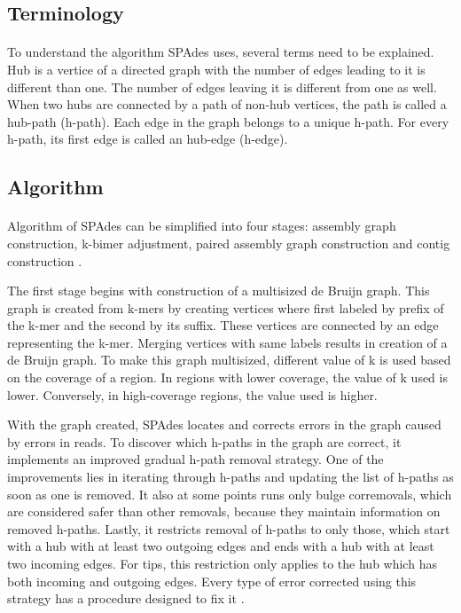 \subsection{Terminology}
\paragraph*{}
To understand the algorithm SPAdes uses, several terms need to be explained. Hub is a vertice of a directed graph with the number of edges leading to it is different than one. The number of edges leaving it is different from one as well. When two hubs are connected by a path of non-hub vertices, the path is called a hub-path (h-path). Each edge in the graph belongs to a unique h-path. For every h-path, its first edge is called an hub-edge (h-edge).

\subsection{Algorithm}
\paragraph*{}
Algorithm of SPAdes can be simplified into four stages: assembly graph construction, k-bimer adjustment, paired assembly graph construction and contig construction \cite{bankevich2012spades}. 

The first stage begins with construction of a multisized de Bruijn graph. This graph is created from k-mers by creating vertices where first labeled by prefix of the k-mer and the second by its suffix. These vertices are connected by an edge representing the k-mer. Merging vertices with same labels results in creation of a de Bruijn graph. To make this graph multisized, different value of k is used based on the coverage of a region. In regions with lower coverage, the value of k used is lower. Conversely, in high-coverage regions, the value used is higher. 

With the graph created, SPAdes locates and corrects errors in the graph caused by errors in reads. To discover which h-paths in the graph are correct, it implements an improved gradual h-path removal strategy. One of the improvements lies in iterating through h-paths and updating the list of h-paths as soon as one is removed. It also at some points runs only bulge corremovals, which are considered safer than other removals, because they maintain information on removed h-paths. Lastly, it restricts removal of h-paths to only those, which start with a hub with at least two outgoing edges and ends with a hub with at least two incoming edges. For tips, this restriction only applies to the hub which has both incoming and outgoing edges. Every type of error corrected using this strategy has a procedure designed to fix it \cite{bankevich2012spades}.

